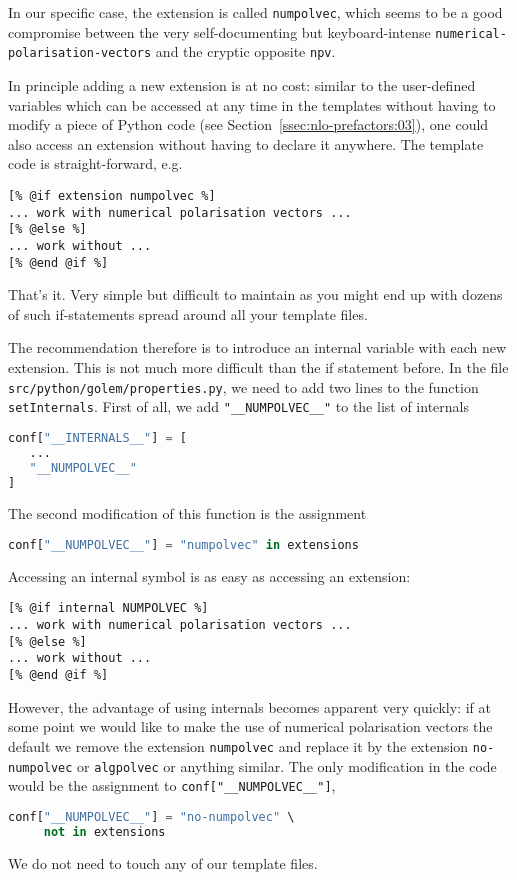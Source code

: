 \documentclass[11pt,a4paper]{refrep}
\begin{document}
In our specific case, the extension is called \texttt{numpolvec},
which seems to be a good compromise between the very self-documenting
but keyboard-intense \texttt{numerical-polarisation-vectors} and the
cryptic opposite \texttt{npv}.

In principle adding a new extension is at no cost: similar to the
user-defined variables which can be accessed at any time in the templates
without having to modify a piece of Python code
(see Section~\ref{ssec:nlo-prefactors:03}), one could also access
an extension without having to declare it anywhere. The template
code is straight-forward, e.g.
\begin{lstlisting}
[% @if extension numpolvec %]
... work with numerical polarisation vectors ...
[% @else %]
... work without ...
[% @end @if %]
\end{lstlisting}
That's it. Very simple but difficult to maintain as you might end up
with dozens of such if-statements spread around all your template files.

The recommendation therefore is to introduce an internal variable
with each new extension. This is not much more difficult than the
if statement before. In the file
\texttt{src/\hspace{0pt}python/\hspace{0pt}golem/\hspace{0pt}properties.py},
we need to add two lines to the function \texttt{setInternals}.
First of all, we add \texttt{"\_\_NUMPOLVEC\_\_"} to the list of internals
\begin{lstlisting}[language=Python]
conf["__INTERNALS__"] = [
   ...
   "__NUMPOLVEC__"
]
\end{lstlisting}
The second modification of this function is the assignment
\begin{lstlisting}[language=Python]
conf["__NUMPOLVEC__"] = "numpolvec" in extensions
\end{lstlisting}

Accessing an internal symbol is as easy as accessing an extension:
\begin{lstlisting}
[% @if internal NUMPOLVEC %]
... work with numerical polarisation vectors ...
[% @else %]
... work without ...
[% @end @if %]
\end{lstlisting}
However, the advantage of using internals becomes apparent very
quickly: if at some point we would like to make the use of numerical
polarisation vectors the default we remove the extension \texttt{numpolvec}
and replace it by the extension \texttt{no-numpolvec} or \texttt{algpolvec}
or anything similar. The only modification in the code would be the
assignment to \texttt{conf["\_\_NUMPOLVEC\_\_"]},
\begin{lstlisting}[language=Python]
conf["__NUMPOLVEC__"] = "no-numpolvec" \
     not in extensions
\end{lstlisting}
We do not need to touch any of our template files.
\end{document}
